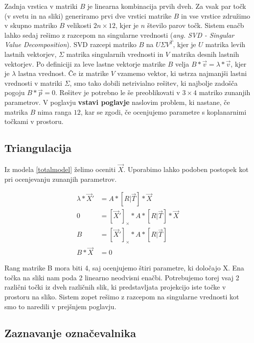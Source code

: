 \documentclass[a4paper, 12pt]{book}
\begin{document}
Zadnja vrstica v matriki $B$ je linearna kombinacija prvih dveh. Za vsak par točk (v svetu in na sliki) generiramo prvi dve vrstici matrike $B$ in vse vrstice združimo v skupno matriko $B$ velikosti $2n \times 12$, kjer je $n$ število parov točk. Sistem enačb lahko sedaj rešimo z razcepom na singularne vrednosti (\emph{ang. SVD - Singular Value Decomposition}). SVD razcepi matriko $B$ na $U \Sigma V^T$, kjer je $U$ matrika levih lastnih vektorjev, $\Sigma$ matrika singularnih vrednosti in $V$ matrika desnih lastnih vektorjev. Po definiciji za leve lastne vektorje matrike $B$ velja $B * \vec{v} = \lambda * \vec{v}$, kjer je $\lambda$ lastna vrednost. Če iz matrike $V$ vzamemo vektor, ki ustrza najmanjši lastni vrednosti v matriki $\Sigma$, smo tako dobili netrivialno rešitev, ki najbolje zadošča pogoju $B * \vec{p} = 0$. Rešitev je potrebno le še preoblikovati v $3 \times 4$ matriko zunanjih parametrov. V poglavju \textbf{vstavi poglavje} naslovim problem, ki nastane, če matrika $B$ nima ranga $12$, kar se zgodi, če ocenjujemo parametre s koplanarnimi točkami v prostoru.

\subsection{Triangulacija}

Iz modela \eqref{totalmodel} želimo oceniti $\vec{X}$. Uporabimo lahko podoben postopek kot pri ocenjevanju zunanjih parametrov.

\begin{align}
\lambda * \vec{X}' &= A * [R | \vec{T}] * \vec{X} \\
0 &= [\vec{X}']_{\times} * A * [R | \vec{T}] * \vec{X} \\
B &= [\vec{X}']_{\times} * A * [R | \vec{T}] \\
B * \vec{X} &= 0
\end{align}

Rang matrike B mora biti 4, saj ocenjujemo štiri parametre, ki določajo X. Ena točka na sliki nam poda 2 linearno neodvisni enačbi. Potrebujemo torej vsaj 2 različni točki iz dveh različnih slik, ki predstavljata projekcijo iste točke v prostoru na sliko. Sistem zopet rešimo z razcepom na singularne vrednosti kot smo to naredili v prejšnjem poglavju.

\subsection{Zaznavanje označevalnika}
\end{document}
